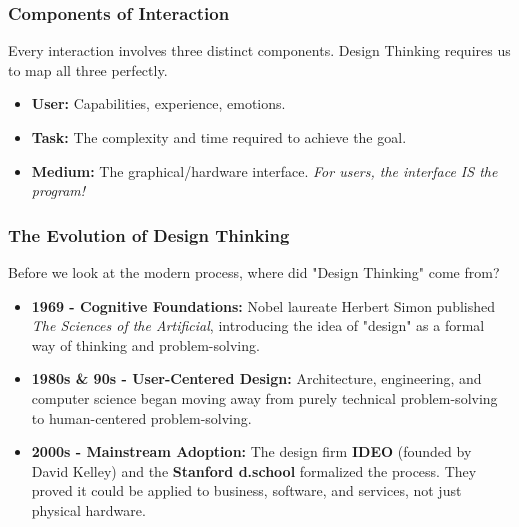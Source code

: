 \documentclass[xcolor=table]{beamer}
\begin{document}
\begin{frame}[fragile]
    \frametitle{Components of Interaction}
    \small
    Every interaction involves three distinct components. Design Thinking requires us to map all three perfectly.
    
    \vspace{0.1cm}
    \centering
    
    \vspace{0.1cm}
    \begin{itemize}
        \item \textbf{User:} Capabilities, experience, emotions.
        \item \textbf{Task:} The complexity and time required to achieve the goal.
        \item \textbf{Medium:} The graphical/hardware interface. \textit{For users, the interface IS the program!}
    \end{itemize}
\end{frame}

\begin{frame}
    \frametitle{The Evolution of Design Thinking}
    Before we look at the modern process, where did "Design Thinking" come from?
    
    \begin{itemize}
        \item \textbf{1969 - Cognitive Foundations:} Nobel laureate Herbert Simon published \textit{The Sciences of the Artificial}, introducing the idea of "design" as a formal way of thinking and problem-solving.
        \item \textbf{1980s \& 90s - User-Centered Design:} Architecture, engineering, and computer science began moving away from purely technical problem-solving to human-centered problem-solving.
        \item \textbf{2000s - Mainstream Adoption:} The design firm \textbf{IDEO} (founded by David Kelley) and the \textbf{Stanford d.school} formalized the process. They proved it could be applied to business, software, and services, not just physical hardware.
    \end{itemize}
\end{frame}
\end{document}
